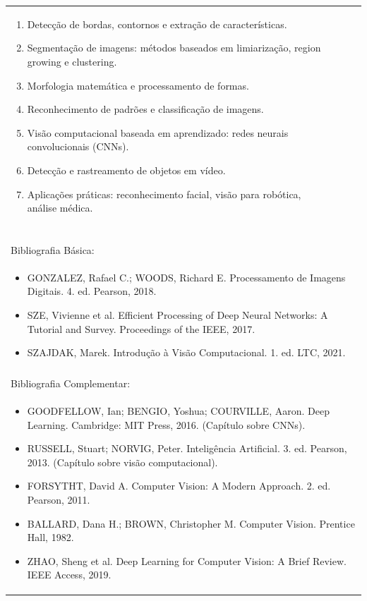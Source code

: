 \documentclass[11pt]{article}
\begin{document}
\begin{center}
\begin{longtable}{|p{4cm}|p{4cm}|p{4cm}|p{4cm}|}
{\begin{enumerate}
\item Detecção de bordas, contornos e extração de características.
\item Segmentação de imagens: métodos baseados em limiarização, region growing e clustering.
\item Morfologia matemática e processamento de formas.
\item Reconhecimento de padrões e classificação de imagens.
\item Visão computacional baseada em aprendizado: redes neurais convolucionais (CNNs).
\item Detecção e rastreamento de objetos em vídeo.
\item Aplicações práticas: reconhecimento facial, visão para robótica, análise médica.\end{enumerate}}\\
\multicolumn{4}{|p{16cm}|}{}\\
\multicolumn{4}{|p{16cm}|}{}\\
\multicolumn{4}{|p{16cm}|}{\vspace{-1cm}}\\
\multicolumn{4}{|p{16cm}|}{}\\
\hline
\multicolumn{4}{|p{16cm}|}{Bibliografia Básica:}\\
\multicolumn{4}{|p{16cm}|}{%
\begin{itemize}\item GONZALEZ, Rafael C.; WOODS, Richard E. Processamento de Imagens Digitais. 4. ed. Pearson, 2018.
\item SZE, Vivienne et al. Efficient Processing of Deep Neural Networks: A Tutorial and Survey. Proceedings of the IEEE, 2017.
\item SZAJDAK, Marek. Introdução à Visão Computacional. 1. ed. LTC, 2021.\end{itemize}}\\
\multicolumn{4}{|p{16cm}|}{}\\
\hline
\multicolumn{4}{|p{16cm}|}{Bibliografia Complementar:}\\
\multicolumn{4}{|p{16cm}|}{%
\begin{itemize}\item GOODFELLOW, Ian; BENGIO, Yoshua; COURVILLE, Aaron. Deep Learning. Cambridge: MIT Press, 2016. (Capítulo sobre CNNs).
\item RUSSELL, Stuart; NORVIG, Peter. Inteligência Artificial. 3. ed. Pearson, 2013. (Capítulo sobre visão computacional).
\item FORSYTHT, David A. Computer Vision: A Modern Approach. 2. ed. Pearson, 2011.
\item BALLARD, Dana H.; BROWN, Christopher M. Computer Vision. Prentice Hall, 1982.
\item ZHAO, Sheng et al. Deep Learning for Computer Vision: A Brief Review. IEEE Access, 2019.\end{itemize}}\\
\hline
\end{longtable}
\end{center}
\end{document}
